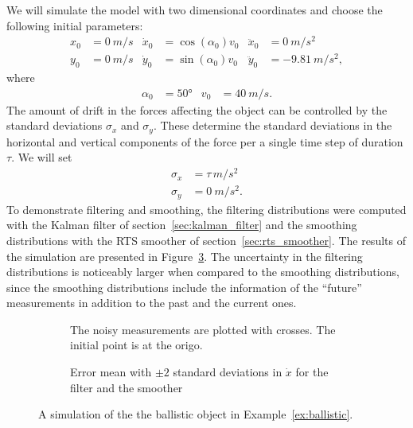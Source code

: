 \begin{example}
We will simulate the model with two dimensional coordinates
and choose the following initial parameters:
\begin{align}
	x_0 &= \SI{0}{m/s} & \dot{x}_0&=\cos(\alpha_0)v_0 & \ddot{x}_0&=\SI{0}{m/s^2}\\
	y_0 &= \SI{0}{m/s} & \dot{y}_0&=\sin(\alpha_0)v_0 & \ddot{y}_0&=\SI{-9.81}{m/s^2},
\end{align}
where
\begin{align}
	\alpha_0 &= \ang{50} & v_0&=\SI{40}{m/s}.
\end{align}
 The amount of drift in the forces affecting the object can be
 controlled by the standard deviations $\sigma_x$ and $\sigma_y$.
These determine the standard deviations in the horizontal and vertical
components of the force per a single time step of duration $\tau$.
We will set 
\begin{align}
	\sigma_x&=\tau\,\si{m/s^2}\\
	\sigma_y&=\SI{0}{m/s^2}.
\end{align} 
To demonstrate filtering and smoothing, the filtering distributions were
computed with the Kalman filter of section~\ref{sec:kalman_filter} and the smoothing distributions with
the RTS smoother of section~\ref{sec:rts_smoother}. The results of the simulation are presented in
Figure~\ref{fig:ballistic}. The uncertainty in the filtering distributions is noticeably larger
when compared to the smoothing distributions, since the smoothing distributions
include the information of the ``future'' measurements in addition to the past and the current ones.
\end{example}

\begin{figure}[htb]%
    \centering%
    \begin{subfigure}[b]{0.5\textwidth}%
    	\centering%
    	\caption{The noisy measurements are plotted with crosses. The initial point is at the origo.}%
		\label{fig:ballistic_flight}%
    \end{subfigure}%
    \begin{subfigure}[b]{0.5\textwidth}%
    	\centering%
    	\caption{Error mean with $\pm 2$ standard deviations in $\dot{x}$ for the filter and the smoother}%
		\label{fig:ballistic_err}%
    \end{subfigure}%
	\caption{A simulation of the the ballistic object in 
	Example~\ref{ex:ballistic}.}
	\label{fig:ballistic}
 \end{figure}




